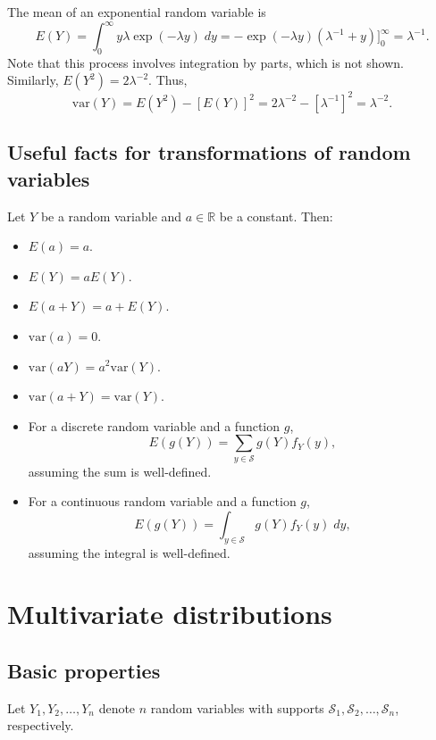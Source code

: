 \documentclass[
]{book}
\providecommand{\tightlist}{%
  \setlength{\itemsep}{0pt}\setlength{\parskip}{0pt}}
\theoremstyle{definition}
\theoremstyle{definition}
\theoremstyle{definition}
\theoremstyle{definition}
\theoremstyle{remark}
\begin{document}
The mean of an exponential random variable is
\[E(Y)=
\int_{0}^{\infty} y\lambda \exp(-\lambda y)\;dy=
-\exp(-\lambda y)(\lambda^{-1}+y)\biggr]^{\infty}_{0}=
\lambda^{-1}.\]
Note that this process involves integration by parts, which is not shown. Similarly, \(E(Y^2)=2\lambda^{-2}\). Thus,
\[
\mathrm{var}(Y)=
E(Y^2)-[E(Y)]^2=
2\lambda^{-2}-[\lambda^{-1}]^2=
\lambda^{-2}.
\]

\hypertarget{useful-facts-for-transformations-of-random-variables}{%
\subsection{Useful facts for transformations of random variables}\label{useful-facts-for-transformations-of-random-variables}}

Let \(Y\) be a random variable and \(a\in\mathbb{R}\) be a constant. Then:

\begin{itemize}
\tightlist
\item
  \(E(a) = a\).
\item
  \(E(Y) = a E(Y)\).
\item
  \(E(a + Y) = a + E(Y)\).
\item
  \(\mathrm{var}(a) = 0\).
\item
  \(\mathrm{var}(aY) = a^2 \mathrm{var}(Y)\).
\item
  \(\mathrm{var}(a + Y) = \mathrm{var}(Y)\).
\item
  For a discrete random variable and a function \(g\), \[E(g(Y))=\sum_{y\in\mathcal{S}}g(Y)f_Y(y),\]
  assuming the sum is well-defined.
\item
  For a continuous random variable and a function \(g\), \[E(g(Y))=\int_{y\in\mathcal{S}}g(Y)f_Y(y)\;dy,\]
  assuming the integral is well-defined.
\end{itemize}

\hypertarget{multivariate-distributions}{%
\section{Multivariate distributions}\label{multivariate-distributions}}

\hypertarget{basic-properties}{%
\subsection{Basic properties}\label{basic-properties}}

Let \(Y_1,Y_2,\ldots,Y_n\) denote \(n\) random variables with supports \(\mathcal{S}_1,\mathcal{S}_2,\ldots,\mathcal{S}_n\), respectively.
\end{document}
